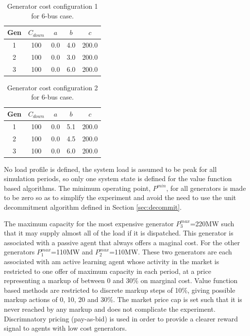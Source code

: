 %

\begin{table}
\begin{center}
\begin{tabular}{c|c|c|c|c}
\hline
Gen &$C_{down}$ &$a$ &$b$ &$c$ \\
\hline\hline
 1 &100 &0.0 &4.0 &200.0 \\
 2 &100 &0.0 &3.0 &200.0 \\
 3 &100 &0.0 &6.0 &200.0 \\
\hline
\end{tabular}
\caption{Generator cost configuration 1 for 6-bus case.}
\label{tbl:case6ww_gencost1}
\end{center}
\end{table}

\begin{table}
\begin{center}
\begin{tabular}{c|c|c|c|c}
\hline
Gen &$C_{down}$ &$a$ &$b$ &$c$ \\
\hline\hline
 1 &100 &0.0 &5.1 &200.0 \\
 2 &100 &0.0 &4.5 &200.0 \\
 3 &100 &0.0 &6.0 &200.0 \\
\hline
\end{tabular}
\caption{Generator cost configuration 2 for 6-bus case.}
\label{tbl:case6ww_gencost2}
\end{center}
\end{table}

No load profile is defined, the system load is assumed to be peak for all
simulation periods, so only one system state is defined for the value function
based algorithms.  The minimum operating point, $P^{min}$, for all generators
is made to be zero so as to simplify the experiment and avoid the need to
use the unit decommitment algorithm defined in Section \ref{sec:decommit}.

The maximum capacity for the most expensive generator $P^{max}_3$=220MW such
that it may supply almost all of the load if it is dispatched.  This
generator is associated with a passive agent that always offers a maginal
cost.  For the other generators $P^{max}_1$=110MW and $P^{max}_2$=110MW.  These
two generators are each associated with am active learning agent whose activity
in the market is restricted to one offer of maximum capacity in each period,
at a price representing a markup of between 0 and 30\% on marginal cost.
Value function based methods are restricted to discrete markup steps of 10\%,
giving possible markup actions of 0, 10, 20 and 30\%. The market price cap is
set such that it is never reached by any markup and does not complicate the
experiment.  Discrimnatory pricing (pay-as-bid) is used in order to provide a
clearer reward signal to agents with low cost generators.

